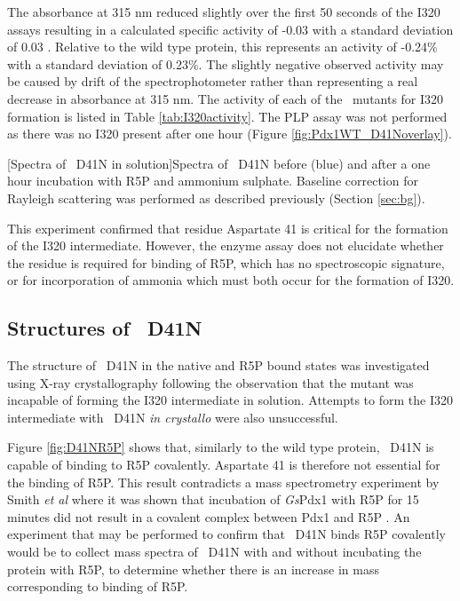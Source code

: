 The absorbance at 315 nm reduced slightly over the first 50 seconds of the I320 assays resulting in a calculated specific activity of -0.03 \act with a standard deviation of 0.03 \act. Relative to the wild type protein, this represents an activity of -0.24\% with a standard deviation of 0.23\%. The slightly negative observed activity may be caused by drift of the spectrophotometer rather than representing a real decrease in absorbance at 315 nm. The activity of each of the \atpdx ~mutants for I320 formation is listed in Table \ref{tab:I320activity}. The PLP assay was not performed as there was no I320 present after one hour (Figure \ref{fig:Pdx1WT_D41Noverlay}). 
\FloatBarrier    
\begin{minipage}{\linewidth}
		\label{fig:Pdx1WT_D41Noverlay}

	[Spectra of \atpdx ~D41N in solution]{Spectra of \atpdx ~D41N before (blue) and after a one hour incubation with R5P and ammonium sulphate. Baseline correction for Rayleigh scattering was performed as described previously (Section \ref{sec:bg}).}	
\end{minipage} 

This experiment confirmed that residue Aspartate 41 is critical for the formation of the \atpdx I320 intermediate. However, the enzyme assay does not elucidate whether the residue is required for binding of R5P, which has no spectroscopic signature, or for incorporation of ammonia which must both occur for the formation of I320.    

\subsection*{Structures of \atpdx ~D41N}
The structure of \atpdx ~D41N in the native and R5P bound states was investigated using X-ray crystallography following the observation that the mutant was incapable of forming the I320 intermediate in solution. Attempts to form the I320 intermediate with \atpdx ~D41N \textit{in crystallo} were also unsuccessful.

Figure \ref{fig:D41NR5P} shows that, similarly to the wild type protein, \atpdx ~D41N is capable of binding to R5P covalently. Aspartate 41 is therefore not essential for the binding of R5P. This result contradicts a mass spectrometry experiment by Smith \textit{et al} where it was shown that incubation of \textit{Gs}Pdx1 with R5P for 15 minutes did not result in a covalent complex between Pdx1 and R5P \cite{Smith2015}. An experiment that may be performed to confirm that \atpdx ~D41N binds R5P covalently would be to collect mass spectra of \atpdx ~D41N with and without incubating the protein with R5P, to determine whether there is an increase in mass corresponding to binding of R5P.  

